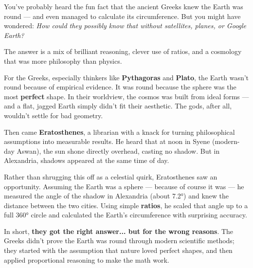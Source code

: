 \begin{tcolorbox}[colback=blue!5!white, colframe=blue!50!black, title={Historical Sidebar: How the Greeks Measured the Earth — For All the Wrong Reasons}]

  You’ve probably heard the fun fact that the ancient Greeks knew the Earth was round — and even managed to calculate its circumference. But you might have wondered: \textit{How could they possibly know that without satellites, planes, or Google Earth?}

  \medskip
  
  The answer is a mix of brilliant reasoning, clever use of ratios, and a cosmology that was more philosophy than physics.

  \medskip
  
  For the Greeks, especially thinkers like \textbf{Pythagoras} and \textbf{Plato}, the Earth wasn’t round because of empirical evidence. It was round because the sphere was the most \textbf{perfect} shape. In their worldview, the cosmos was built from ideal forms — and a flat, jagged Earth simply didn’t fit their aesthetic. The gods, after all, wouldn’t settle for bad geometry.

  \medskip
  
  Then came \textbf{Eratosthenes}, a librarian with a knack for turning philosophical assumptions into measurable results. He heard that at noon in Syene (modern-day Aswan), the sun shone directly overhead, casting no shadow. But in Alexandria, shadows appeared at the same time of day. 

  \medskip
  
  Rather than shrugging this off as a celestial quirk, Eratosthenes saw an opportunity. Assuming the Earth was a sphere — because of course it was — he measured the angle of the shadow in Alexandria (about 7.2°) and knew the distance between the two cities. Using simple \textbf{ratios}, he scaled that angle up to a full 360° circle and calculated the Earth's circumference with surprising accuracy.

  \medskip
  
  In short, \textbf{they got the right answer... but for the wrong reasons}. The Greeks didn’t prove the Earth was round through modern scientific methods; they started with the assumption that nature loved perfect shapes, and then applied proportional reasoning to make the math work.

\end{tcolorbox}
